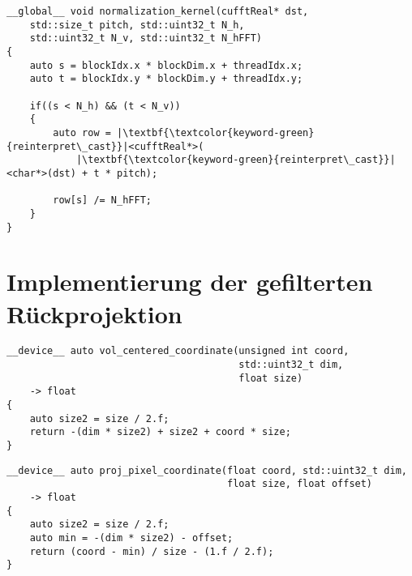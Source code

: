 \begin{code}
\begin{verbatim}
__global__ void normalization_kernel(cufftReal* dst,
    std::size_t pitch, std::uint32_t N_h,
    std::uint32_t N_v, std::uint32_t N_hFFT)
{
    auto s = blockIdx.x * blockDim.x + threadIdx.x;
    auto t = blockIdx.y * blockDim.y + threadIdx.y;

    if((s < N_h) && (t < N_v))
    {
        auto row = |\textbf{\textcolor{keyword-green}{reinterpret\_cast}}|<cufftReal*>(
            |\textbf{\textcolor{keyword-green}{reinterpret\_cast}}|<char*>(dst) + t * pitch);

        row[s] /= N_hFFT;
    }
}
\end{verbatim}
\label{app:filter_norm}
\end{code}

\section{Implementierung der gefilterten Rückprojektion}

\begin{code}
\begin{verbatim}
__device__ auto vol_centered_coordinate(unsigned int coord,
                                        std::uint32_t dim,
                                        float size)
    -> float
{
    auto size2 = size / 2.f;
    return -(dim * size2) + size2 + coord * size;
}
\end{verbatim}
\label{app:coord_vol}
\end{code}

\begin{code}
\begin{verbatim}
__device__ auto proj_pixel_coordinate(float coord, std::uint32_t dim,
                                      float size, float offset)
    -> float
{
    auto size2 = size / 2.f;
    auto min = -(dim * size2) - offset;
    return (coord - min) / size - (1.f / 2.f);
}
\end{verbatim}
\label{app:coord_det}
\end{code}

